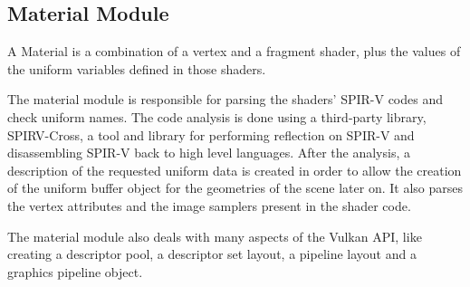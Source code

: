 \subsection{Material Module}
A Material is a combination of a vertex and a fragment shader, plus the values of the uniform variables defined in those shaders.

The material module is responsible for parsing the shaders' SPIR-V codes and check uniform names. The code analysis is done using a third-party library, SPIRV-Cross, a tool and library for performing reflection on SPIR-V and disassembling SPIR-V back to high level languages. After the analysis, a description of the requested uniform data is created in order to allow the creation of the uniform buffer object for the geometries of the scene later on. It also parses the vertex attributes and the image samplers present in the shader code.

The material module also deals with many aspects of the Vulkan API, like creating a descriptor pool, a descriptor set layout, a pipeline layout and a graphics pipeline object.

